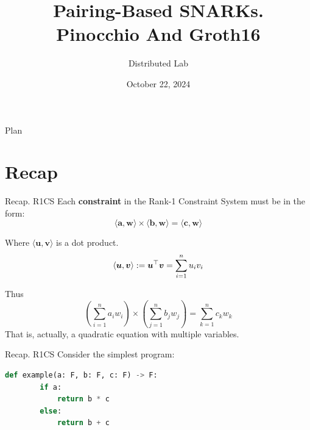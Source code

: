 \documentclass{zkdl-presentation-template}
\title[zk-SNARK: Part III]{\textbf{Pairing-Based SNARKs.\\Pinocchio And Groth16}}
\author{Distributed Lab}
\date{October 22, 2024}
\begin{document}

    \begin{frame}{Plan}
        \tableofcontents
    \end{frame}

    \section{Recap}

    \begin{frame}{Recap. R1CS}
        Each \textbf{constraint} in the Rank-1 Constraint System must be in the form:
        \begin{equation*}
            \langle \boldsymbol{a}, \boldsymbol{w}\rangle \times \langle \boldsymbol{b}, \boldsymbol{w}\rangle = \langle \boldsymbol{c}, \boldsymbol{w}\rangle
        \end{equation*}
        
        Where $\langle \boldsymbol{u}, \boldsymbol{v}\rangle$ is a dot product.
        \vspace{-10pt}
        \begin{equation*}
            \langle \boldsymbol{u}, \boldsymbol{v} \rangle := \boldsymbol{u}^{\top}\boldsymbol{v} = \sum_{i=1}^{n} u_i v_i 
            \vspace{-5pt}
        \end{equation*}
        
        Thus
        \vspace{-5pt}
        \begin{equation*}
            \left(\sum_{i=1}^{n} a_i w_i\right) \times \left(\sum_{j=1}^{n} b_j w_j\right) = \sum_{k=1}^{n} c_k w_k
        \end{equation*}
        That is, actually, a quadratic equation with multiple variables.
    \end{frame}

    \begin{frame}[fragile]{Recap. R1CS}
        Consider the simplest program:
        \vspace{10pt}
        \begin{lstlisting}[language=Python,numbers=none]
    def example(a: F, b: F, c: F) -> F:
        if a:
            return b * c 
        else:
            return b + c
        \end{lstlisting}
    \end{frame}
\end{document}
